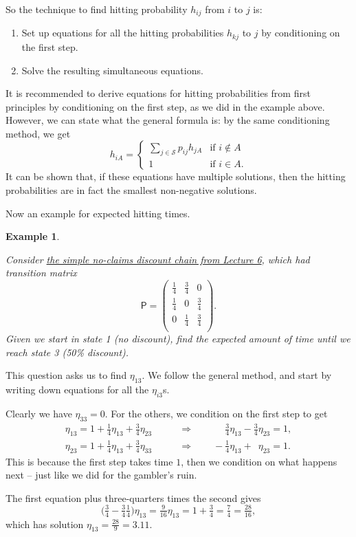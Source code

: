 \documentclass[
  a4paper,
]{article}
\providecommand{\tightlist}{%
  \setlength{\itemsep}{0pt}\setlength{\parskip}{0pt}}
\theoremstyle{definition}
\theoremstyle{definition}
\newtheorem{example}{Example}[section]
\theoremstyle{definition}
\theoremstyle{remark}
\begin{document}
So the technique to find hitting probability \(h_{ij}\) from \(i\) to \(j\) is:

\begin{enumerate}
\def\labelenumi{\arabic{enumi}.}
\tightlist
\item
  Set up equations for all the hitting probabilities \(h_{kj}\) to \(j\) by conditioning on the first step.
\item
  Solve the resulting simultaneous equations.
\end{enumerate}

It is recommended to derive equations for hitting probabilities from first principles by conditioning on the first step, as we did in the example above. However, we can state what the general formula is: by the same conditioning method, we get
\[ h_{iA} = \begin{cases} \displaystyle\sum_{j \in \mathcal S} p_{ij} h_{jA} & \text{if $i \not\in A$} \\
1 & \text{if $i \in A$.} \end{cases} \]
It can be shown that, if these equations have multiple solutions, then the hitting probabilities are in fact the smallest non-negative solutions.

Now an example for expected hitting times.

\begin{example}
\protect\hypertarget{exm:hitting2}{}\label{exm:hitting2}

\emph{Consider \protect\hyperlink{S06-example1}{the simple no-claims discount chain from Lecture 6}, which had transition matrix}
\[ \mathsf P =\begin{pmatrix}
    \tfrac14 &\tfrac34 & 0\\
    \tfrac14 &0 & \tfrac34\\
    0 &\tfrac14 & \tfrac34\\
    \end{pmatrix} .\]
\emph{Given we start in state 1 (no discount), find the expected amount of time until we reach state 3 (50\% discount).}

This question asks us to find \(\eta_{13}\). We follow the general method, and start by writing down equations for all the \(\eta_{i3}\)s.

Clearly we have \(\eta_{33} = 0\).
For the others, we condition on the first step to get
\begin{align*}
\eta_{13} = 1 + \tfrac14 \eta_{13} + \tfrac34 \eta_{23} \qquad &\Rightarrow \qquad \phantom{-}\tfrac34 \eta_{13} - \tfrac34\eta_{23} = 1 ,\\
\eta_{23} = 1 + \tfrac14 \eta_{13} + \tfrac34 \eta_{33} \qquad &\Rightarrow \qquad  - \tfrac14\eta_{13} + \phantom{\tfrac34}\eta_{23} = 1 .
\end{align*}
This is because the first step takes time \(1\), then we condition on what happens next -- just like we did for the gambler's ruin.

The first equation plus three-quarters times the second gives
\[ \big(\tfrac34 - \tfrac34\tfrac14\big) \eta_{13} = \tfrac{9}{16}\eta_{13} = 1 + \tfrac34 = \tfrac 74 = \tfrac{28}{16} ,\]
which has solution \(\eta_{13} = \tfrac{28}{9} = 3.11\).

\end{example}
\end{document}
